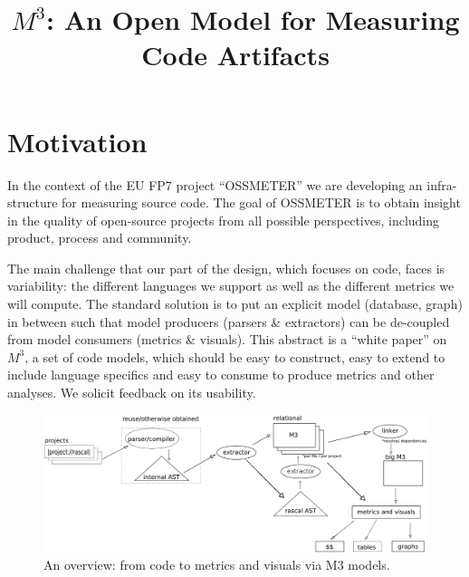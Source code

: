 \documentclass[conference]{IEEEtran}
\newcommand{\mthree}{\ensuremath{M^3}}
\begin{document}
\title{{\huge $M^3$: An Open Model for Measuring Code Artifacts}}

\author{
\and
{}
}

\maketitle

\section{Motivation}

In the context of the EU FP7 project ``OSSMETER'' we are developing an infra-
structure for measuring source code. The goal of OSSMETER is to obtain insight
in the quality of open-source projects from all possible perspectives,
including product, process and community.

The main challenge that our part of the design, which focuses on code, faces
is variability: the different languages we support as well as the different
metrics we will compute. The standard solution is to put an explicit model
(database, graph) in between such that model producers (parsers \& extractors)
can be de-coupled from model consumers (metrics \& visuals). This abstract is
a ``white paper'' on \mthree, a set of code models, which should be easy to
construct, easy to extend to include language specifics and easy to consume to
produce metrics and other analyses. We solicit feedback on its usability.

\begin{figure}[t]
\includegraphics[width=\columnwidth]{m3}
\caption{An overview: from code to metrics and visuals via M3 models.}
\end{figure}
\end{document}
